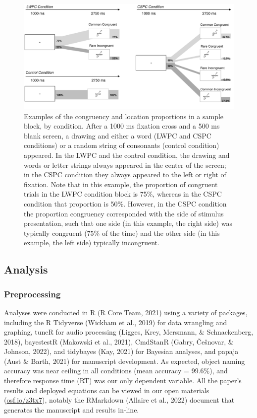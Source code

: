 \documentclass[
  ,man,floatsintext]{apa6}
\begin{document}
\begin{figure}[!h]
\includegraphics[width=\textwidth]{figure_1} \caption{Examples of the congruency and location proportions in a sample block, by condition. After a 1000 ms fixation cross and a 500 ms blank screen, a drawing and either a word (LWPC and CSPC conditions) or a random string of consonants (control condition) appeared. In the LWPC and the control condition, the drawing and words or letter strings always appeared in the center of the screen; in the CSPC condition they always appeared to the left or right of fixation. Note that in this example, the proportion of congruent trials in the LWPC condition block is 75\%, whereas in the CSPC condition that proportion is 50\%. However, in the CSPC condition the proportion congruency corresponded with the side of stimulus presentation, such that one side (in this example, the right side) was typically congruent (75\% of the time) and the other side (in this example, the left side) typically incongruent.}\label{fig:figure1}
\end{figure}



\hypertarget{analysis}{%
\subsection{Analysis}\label{analysis}}

\hypertarget{preprocessing}{%
\subsubsection{Preprocessing}\label{preprocessing}}

Analyses were conducted in R (R Core Team, 2021) using a variety of packages, including the R Tidyverse (Wickham et al., 2019) for data wrangling and graphing, tuneR for audio processing (Ligges, Krey, Mersmann, \& Schnackenberg, 2018), bayestestR (Makowski et al., 2021), CmdStanR (Gabry, Češnovar, \& Johnson, 2022), and tidybayes (Kay, 2021) for Bayesian analyses, and papaja (Aust \& Barth, 2021) for manuscript development. As expected, object naming accuracy was near ceiling in all conditions (mean accuracy = 99.6\%), and therefore response time (RT) was our only dependent variable. All the paper's results and deployed equations can be viewed in our open materials (\href{https://osf.io/z3tx7}{osf.io/z3tx7}), notably the RMarkdown (Allaire et al., 2022) document that generates the manuscript and results in-line.
\end{document}
